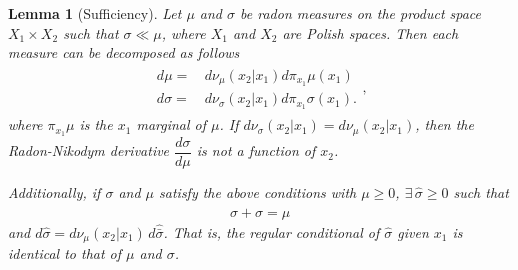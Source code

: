 \documentclass[dvipsnames]{article}
\newtheorem{lemma}{Lemma}
\begin{document}
\centering{\rule{.5\columnwidth}{1pt}}
\begin{lemma}[Sufficiency]
\label{lemma:sufficiency}
    Let $\mu$ and $\sigma$ be radon measures on the product space $X_1\times X_2$ such that $\sigma \ll \mu$, where $X_1$ and $X_2$ are Polish spaces. Then each measure can be decomposed as follows
    \begin{align}
    \begin{aligned}
        d\mu=&\,d\nu_{\mu}(x_2|x_1)d\pi_{x_1}\mu(x_1)\\
        d\sigma=&\,d\nu_{\sigma}(x_2|x_1)d\pi_{x_1}\sigma(x_1).
        \end{aligned},
        \label{eqn:polish:decomp}
    \end{align}
    where $\pi_{x_1}\mu$ is the $x_1$ marginal of $\mu$. If $d\nu_\sigma(x_2|x_1)=d\nu_{\mu}(x_2|x_1)$, then the Radon-Nikodym derivative $\dfrac{d\sigma}{d\mu}$ is not a function of $x_2$.
    \par
    Additionally, if $\sigma$ and $\mu$ satisfy the above conditions with $\mu\ge 0$, $\exists\, \hat\sigma\ge 0$ such that 
    \begin{align}
      \sigma+\hat\sigma=\mu\label{lemma:sufficiency:domination:equality}
    \end{align}
    and $d\hat\sigma=d\nu_\mu(x_2|x_1)\,d\hat{\bar\sigma}$. That is, the regular conditional of $\hat \sigma$ given $x_1$ is identical to that of $\mu$ and $\sigma$.
\end{lemma}
\end{document}
